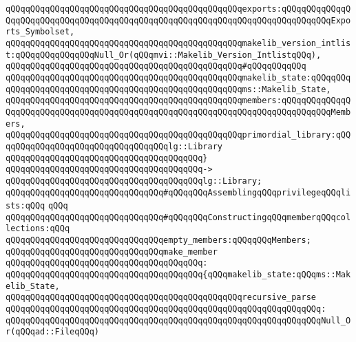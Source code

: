 \verb|qQQqqQQqqQQqqQQqqQQqqQQqqQQqqQQqqQQqqQQqqQQqqQQqexports:qQQqqQQqqQQqqQQqqQQqqQQqqQQqqQQqqQQqqQQqqQQqqQQqqQQqqQQqqQQqqQQqqQQqqQQqqQQqqQQqExports_Symbolset,|\newline
\verb|qQQqqQQqqQQqqQQqqQQqqQQqqQQqqQQqqQQqqQQqqQQqqQQqmakelib_version_intlist:qQQqqQQqqQQqqQQqNull_Or(qQQqmvi::Makelib_Version_IntlistqQQq),|\newline
\verb|qQQqqQQqqQQqqQQqqQQqqQQqqQQqqQQqqQQqqQQqqQQqqQQq#qQQqqQQqqQQq|\newline
\verb|qQQqqQQqqQQqqQQqqQQqqQQqqQQqqQQqqQQqqQQqqQQqqQQqmakelib_state:qQQqqQQqqQQqqQQqqQQqqQQqqQQqqQQqqQQqqQQqqQQqqQQqqQQqqQQqms::Makelib_State,|\newline
\verb|qQQqqQQqqQQqqQQqqQQqqQQqqQQqqQQqqQQqqQQqqQQqqQQqmembers:qQQqqQQqqQQqqQQqqQQqqQQqqQQqqQQqqQQqqQQqqQQqqQQqqQQqqQQqqQQqqQQqqQQqqQQqqQQqqQQqMembers,|\newline
\verb|qQQqqQQqqQQqqQQqqQQqqQQqqQQqqQQqqQQqqQQqqQQqqQQqprimordial_library:qQQqqQQqqQQqqQQqqQQqqQQqqQQqqQQqqQQqlg::Library|\newline
\verb|qQQqqQQqqQQqqQQqqQQqqQQqqQQqqQQqqQQqqQQq}|\newline
\verb|qQQqqQQqqQQqqQQqqQQqqQQqqQQqqQQqqQQqqQQq->|\newline
\verb|qQQqqQQqqQQqqQQqqQQqqQQqqQQqqQQqqQQqqQQqlg::Library;|\newline
\newline
\verb|qQQqqQQqqQQqqQQqqQQqqQQqqQQqqQQq#qQQqqQQqAssemblingqQQqprivilegeqQQqlists:qQQq|\newline
\verb|qQQq|\newline
\verb|qQQqqQQqqQQqqQQqqQQqqQQqqQQqqQQq#qQQqqQQqConstructingqQQqmemberqQQqcollections:qQQq|\newline
\verb|qQQqqQQqqQQqqQQqqQQqqQQqqQQqqQQqempty_members:qQQqqQQqMembers;|\newline
\newline
\verb|qQQqqQQqqQQqqQQqqQQqqQQqqQQqqQQqmake_member|\newline
\verb|qQQqqQQqqQQqqQQqqQQqqQQqqQQqqQQqqQQqqQQq:|\newline
\verb|qQQqqQQqqQQqqQQqqQQqqQQqqQQqqQQqqQQqqQQq{qQQqmakelib_state:qQQqms::Makelib_State,|\newline
\newline
\verb|qQQqqQQqqQQqqQQqqQQqqQQqqQQqqQQqqQQqqQQqqQQqqQQqrecursive_parse|\newline
\verb|qQQqqQQqqQQqqQQqqQQqqQQqqQQqqQQqqQQqqQQqqQQqqQQqqQQqqQQqqQQqqQQq:|\newline
\verb|qQQqqQQqqQQqqQQqqQQqqQQqqQQqqQQqqQQqqQQqqQQqqQQqqQQqqQQqqQQqqQQqNull_Or(qQQqad::FileqQQq)|\newline
